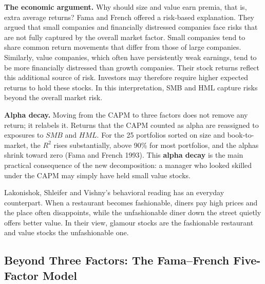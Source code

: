 \textbf{The economic argument.} Why should size and value earn premia, that is, extra average returns? 
Fama and French offered a risk-based explanation. They argued that small companies and financially distressed companies face risks that are not fully captured by the overall market factor. Small companies tend to share common return movements that differ from those of large companies. Similarly, value companies, which often have persistently weak earnings, tend to be more financially distressed than growth companies. Their stock returns reflect this additional source of risk. Investors may therefore require higher expected returns to hold these stocks. In this interpretation, SMB and HML capture risks beyond the overall market risk.

\textbf{Alpha decay.} Moving from the CAPM to three factors does not remove any return; it relabels it. Returns that the CAPM counted as alpha are reassigned to exposures to $SMB$ and $HML$. For the 25 portfolios sorted on size and book-to-market, the $R^2$ rises substantially, above 90\% for most portfolios, and the alphas shrink toward zero (Fama and French 1993). This \textbf{alpha decay} is the main practical consequence of the new decomposition: a manager who looked skilled under the CAPM may simply have held small value stocks.

Lakonishok, Shleifer and Vishny's behavioral reading has an everyday counterpart. When a restaurant becomes fashionable, diners pay high prices and the place often disappoints, while the unfashionable diner down the street quietly offers better value. In their view, glamour stocks are the fashionable restaurant and value stocks the unfashionable one.


\subsection{Beyond Three Factors: The Fama--French Five-Factor Model}
\label{sec:04-multifactor}

